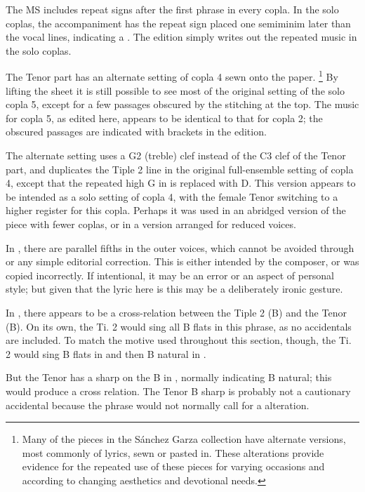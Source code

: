 The MS includes repeat signs after the first phrase in every copla. 
In the solo coplas, the accompaniment has the repeat sign placed one semiminim later than the vocal lines, indicating a .
The edition simply writes out the repeated music in the solo coplas.

The Tenor part has an alternate setting of copla 4 sewn onto the paper.%
  \footnote{Many of the pieces in the Sánchez Garza collection have alternate versions, most commonly of lyrics, sewn or pasted in. These alterations provide evidence for the repeated use of these pieces for varying occasions and according to changing aesthetics and devotional needs.}
By lifting the sheet it is still possible to see most of the original setting of the solo copla 5, except for a few passages obscured by the stitching at the top.
The music for copla 5, as edited here, appears to be identical to that for copla 2; the obscured passages are indicated with brackets in the edition.

The alternate setting uses a G2 (treble) clef instead of the C3 clef of the Tenor part, and duplicates the Tiple 2 line in the original full-ensemble setting of copla 4, except that the repeated high G in  is replaced with D.
This version appears to be intended as a solo setting of copla 4, with the female Tenor switching to a higher register for this copla. 
Perhaps it was used in an abridged version of the piece with fewer coplas, or in a version arranged for reduced voices.



In , there are parallel fifths in the outer voices, which cannot be avoided through  or any simple editorial correction. 
This is either intended by the composer, or was copied incorrectly.
If intentional, it may be an error or an aspect of personal style; but given that the lyric here is  this may be a deliberately ironic gesture.

In , there appears to be a cross-relation between the Tiple 2 (B\fl) and the Tenor (B\na).
On its own, the Ti. 2 would sing all B flats in this phrase, as no accidentals are included.
To match the motive used throughout this section, though, the Ti. 2 would sing B flats in  and then B natural in .

But the Tenor has a sharp on the B in , normally indicating B natural; this would produce a cross relation.
The Tenor B sharp is probably not a cautionary accidental because the phrase would not normally call for a  alteration.

